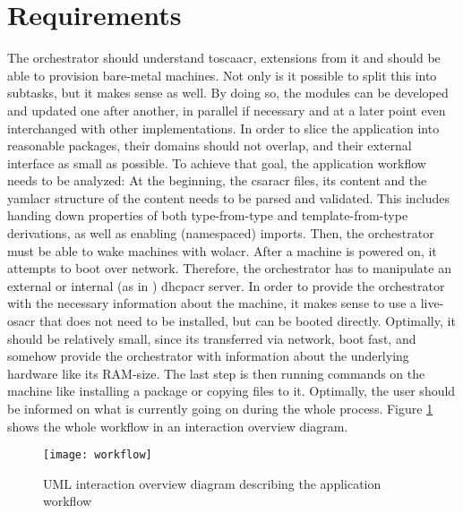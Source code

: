 \section{Requirements}
The orchestrator should understand \gls{toscaacr}, extensions from it and should be able to provision bare-metal machines. Not only is it possible to split this into subtasks, but it makes sense as well. By doing so, the modules can be developed and updated one after another, in parallel if necessary and at a later point even interchanged with other implementations. In order to slice the application into reasonable packages, their domains should not overlap, and their external interface as small as possible.
\newline
To achieve that goal, the application workflow needs to be analyzed:
\newline
At the beginning, the \gls{csaracr} files, its content and the \gls{yamlacr} structure of the content needs to be parsed and validated. This includes handing down properties of both type-from-type and template-from-type derivations, as well as enabling (namespaced) imports.
Then, the orchestrator must be able to wake machines with \gls{wolacr}.
After a machine is powered on, it attempts to boot over network.
Therefore, the orchestrator has to manipulate an external or internal (as in ) \gls{dhcpacr} server.
In order to provide the orchestrator with the necessary information about the machine, it makes sense to use a live-\gls{osacr} that does not need to be installed, but can be booted directly. Optimally, it should be relatively small, since its transferred via network, boot fast, and somehow provide the orchestrator with information about the underlying hardware like its RAM-size.
The last step is then running commands on the machine like installing a package or copying files to it. Optimally, the user should be informed on what is currently going on during the whole process.
\newline
Figure \ref{image:workflow} shows the whole workflow in an interaction overview diagram.

\begin{figure}[H]
  \texttt{[image: workflow]}
  \centering
  \caption{UML interaction overview diagram describing the application workflow}
  \label{image:workflow}
\end{figure}

